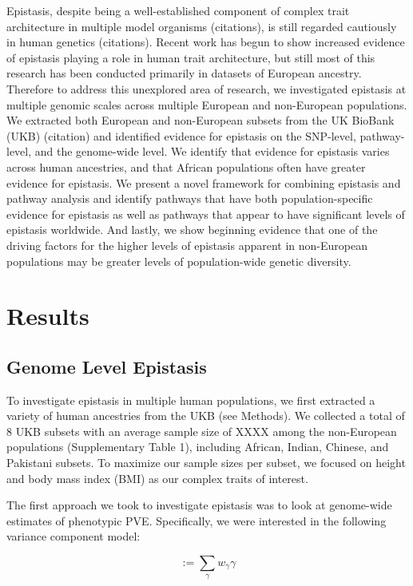 \documentclass[12pt, a4paper]{article}
\begin{document}
Epistasis, despite being a well-established component of complex trait architecture in multiple model organisms (citations), is still regarded cautiously in human genetics (citations). Recent work has begun to show increased evidence of epistasis playing a role in human trait architecture, but still most of this research has been conducted primarily in datasets of European ancestry. Therefore to address this unexplored area of research, we investigated epistasis at multiple genomic scales across multiple European and non-European populations. We extracted both European and non-European subsets from the UK BioBank (UKB) (citation) and identified evidence for epistasis on the SNP-level, pathway-level, and the genome-wide level. We identify that evidence for epistasis varies across human ancestries, and that African populations often have greater evidence for epistasis. We present a novel framework for combining epistasis and pathway analysis and identify pathways that have both population-specific evidence for epistasis as well as pathways that appear to have significant levels of epistasis worldwide. And lastly, we show beginning evidence that one of the driving factors for the higher levels of epistasis apparent in non-European populations may be greater levels of population-wide genetic diversity.


\section{Results}\label{InterPath-Results}

\subsection{Genome Level Epistasis}\label{InterPath-Results-SNPEpistasis}

To investigate epistasis in multiple human populations, we first extracted a variety of human ancestries from the UKB (see Methods). We collected a total of 8 UKB subsets with an average sample size of XXXX among the non-European populations (Supplementary Table 1), including African, Indian, Chinese, and Pakistani subsets. To maximize our sample sizes per subset, we focused on height and body mass index (BMI) as our complex traits of interest. 

The first approach we took to investigate epistasis was to look at genome-wide estimates of phenotypic PVE. Specifically, we were interested in the following variance component model:

\begin{equation}\label{InterPath-GEMMA-Equation-Model}
 := \sum_{\gamma}w_{\gamma} \gamma
\end{equation}
\end{document}

